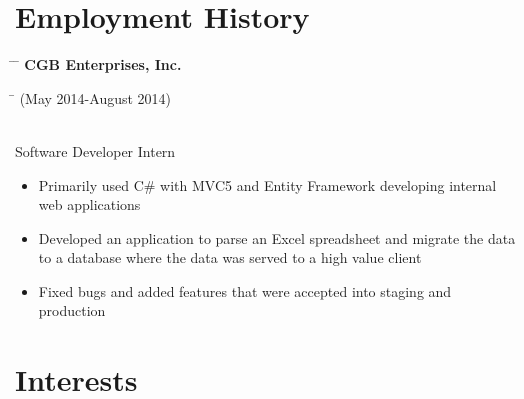 \documentclass[10pt]{article} %
\begin{document}

\section{Employment History}
\vspace{-6mm}

\parbox{0.5\textwidth}{ %
\begin{tabbing} 
\hspace{2cm} \= \hspace{3cm} \= \kill 
\textbf{CGB Enterprises, Inc.}
\end{tabbing}}
\hfill 
\parbox{0.5\textwidth}{ %
\begin{tabbing} 
\hspace{5cm} \= \kill 
(May 2014-August 2014)
\end{tabbing}}
\vspace{-3mm}
\\Software Developer Intern
\vspace{-2mm}
\begin{itemize}
\item Primarily used C\# with MVC5 and Entity Framework developing internal web applications
\vspace{-3mm}
\item Developed an application to parse an Excel spreadsheet and migrate the data to a database where the data was served to a high value client
\vspace{-3mm}
\item Fixed bugs and added features that were accepted into staging and production
\vspace{-3mm}
\end{itemize}


\section{Interests}
\vspace{-3mm}

\end{document}
